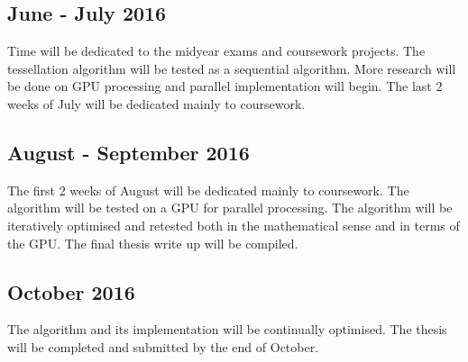 \documentclass{article}
\begin{document}
\subsection{June - July 2016}
Time will be dedicated to the midyear exams and coursework projects. The tessellation algorithm will be tested as a sequential algorithm. More research will be done on GPU processing and parallel implementation will begin. The last 2 weeks of July will be dedicated mainly to coursework.

\subsection{August - September 2016}
The first 2 weeks of August will be dedicated mainly to coursework. The algorithm will be tested on a GPU for parallel processing. The algorithm will be iteratively optimised and retested both in the mathematical sense and in terms of the GPU. The final thesis write up will be compiled.

\subsection{October 2016}
The algorithm and its implementation will be continually optimised. The thesis will be completed and submitted by the end of October.
\end{document}
